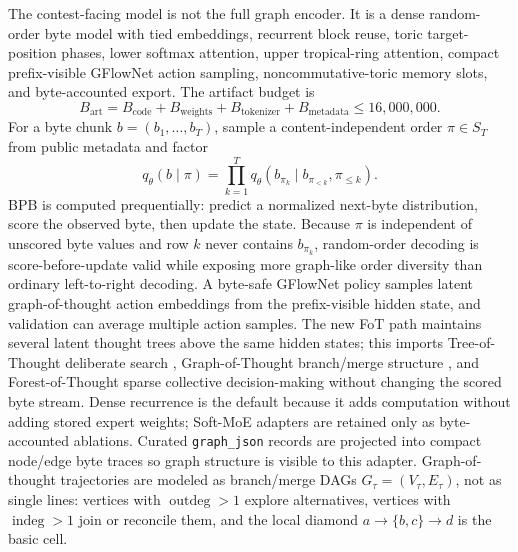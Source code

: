 \documentclass[10pt]{article}
\theoremstyle{definition}
\theoremstyle{plain}
\theoremstyle{remark}
\begin{document}
The contest-facing model is not the full graph encoder.  It is a dense random-order byte model with tied embeddings, recurrent block reuse, toric target-position phases, lower softmax attention, upper tropical-ring attention, compact prefix-visible GFlowNet action sampling, noncommutative-toric memory slots, and byte-accounted export.  The artifact budget is
\begin{equation}
  B_{\mathrm{art}}=B_{\mathrm{code}}+B_{\mathrm{weights}}+B_{\mathrm{tokenizer}}+B_{\mathrm{metadata}}
  \le16{,}000{,}000.
\end{equation}
For a byte chunk $b=(b_1,\ldots,b_T)$, sample a content-independent order $\pi\in S_T$ from public metadata and factor
\begin{equation}
  q_\theta(b\mid \pi)=\prod_{k=1}^Tq_\theta(b_{\pi_k}\mid b_{\pi_{<k}},\pi_{\le k}).
\end{equation}
BPB is computed prequentially: predict a normalized next-byte distribution, score the observed byte, then update the state.  Because $\pi$ is independent of unscored byte values and row $k$ never contains $b_{\pi_k}$, random-order decoding is score-before-update valid while exposing more graph-like order diversity than ordinary left-to-right decoding.  A byte-safe GFlowNet policy samples latent graph-of-thought action embeddings from the prefix-visible hidden state, and validation can average multiple action samples.  The new FoT path maintains several latent thought trees above the same hidden states; this imports Tree-of-Thought deliberate search \cite{yao2023tree}, Graph-of-Thought branch/merge structure \cite{besta2023graph}, and Forest-of-Thought sparse collective decision-making \cite{bi2024forest} without changing the scored byte stream.  Dense recurrence is the default because it adds computation without adding stored expert weights; Soft-MoE adapters are retained only as byte-accounted ablations.  Curated \texttt{graph\_json} records are projected into compact node/edge byte traces so graph structure is visible to this adapter.  Graph-of-thought trajectories are modeled as branch/merge DAGs \(G_\tau=(V_\tau,E_\tau)\), not as single lines: vertices with \(\operatorname{outdeg}>1\) explore alternatives, vertices with \(\operatorname{indeg}>1\) join or reconcile them, and the local diamond \(a\to\{b,c\}\to d\) is the basic cell.
\end{document}
